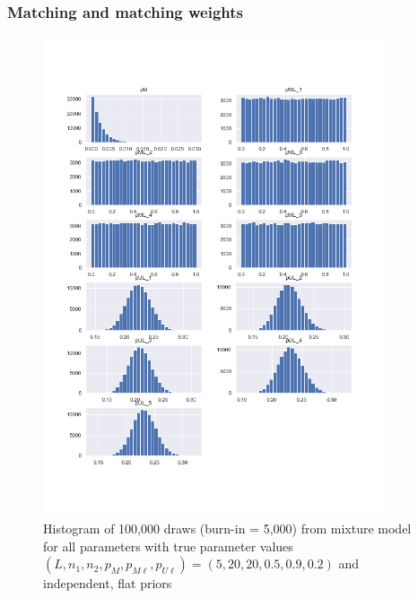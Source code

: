 \documentclass[11pt,reqno]{amsart}
\begin{document}

\subsubsection{Matching and matching weights}


\begin{figure}[h!]
\begin{center}
\includegraphics[width=0.9\textwidth]{../Figures/mm/nM10/allParam_nM10_L5.png}
\vspace{-40pt}
\caption{Histogram of 100,000 draws (burn-in = 5,000) from mixture model for all parameters with true parameter values $(L, n_1, n_2, p_M, p_{M\ell}, p_{U\ell}) = (5, 20, 20, 0.5, 0.9, 0.2)$ and independent, flat priors}
\label{mmLarge}
\end{center}
\end{figure}
\end{document}
